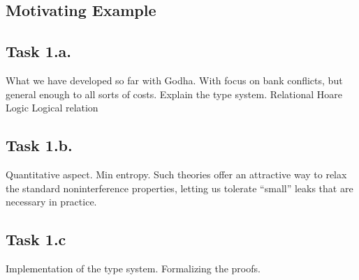 \subsection{Motivating Example}

\subsection{Task 1.a.} What we have developed so far with Godha.
With focus on bank conflicts, but general enough to all sorts of costs.
Explain the type system.
Relational Hoare Logic
Logical relation

\subsection{Task 1.b.} Quantitative aspect.
Min entropy.
Such theories offer an attractive way to relax the standard noninterference properties, letting us tolerate “small” leaks that are necessary in practice. 

\subsection{Task 1.c} Implementation of the type system.
Formalizing the proofs.